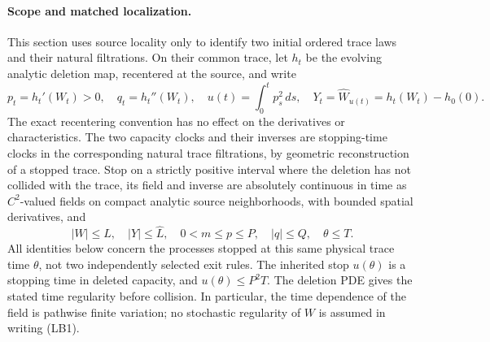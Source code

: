 \documentclass[11pt]{article}
\theoremstyle{definition}\newtheorem{definition}[theorem]{Definition}
\theoremstyle{remark}\newtheorem{remark}[theorem]{Remark}
\begin{document}
\paragraph{Scope and matched localization.}
This section uses source locality only to identify two initial ordered
trace laws and their natural filtrations. On their common trace, let
$h_t$ be the evolving analytic deletion map, recentered at the source,
and write
\[
 p_t=h_t'(W_t)>0,\quad q_t=h_t''(W_t),\quad
 u(t)=\int_0^t p_s^2\,ds,\quad
 Y_t=\widehat W_{u(t)}=h_t(W_t)-h_0(0).
 \tag{LB1}
\]
The exact recentering convention has no effect on the derivatives or
characteristics. The two capacity clocks and their inverses are
stopping-time clocks in the corresponding natural trace filtrations,
by geometric reconstruction of a stopped trace. Stop on a strictly
positive interval where the deletion has not collided with the trace,
its field and inverse are absolutely continuous in time as
$C^2$-valued fields on compact analytic source neighborhoods, with
bounded spatial derivatives, and
\[
 |W|\le L,\quad |Y|\le\widehat L,\quad
 0<m\le p\le P,\quad |q|\le Q,\quad \theta\le T.
 \tag{LB2}
\]
All identities below concern the processes stopped at this same physical
trace time $\theta$, not two independently selected exit rules.
The inherited stop $u(\theta)$ is a stopping time in deleted capacity,
and $u(\theta)\le P^2T$.
The deletion PDE gives the stated time regularity before collision.
In particular, the time dependence of the field is pathwise finite variation;
no stochastic regularity of $W$ is assumed in writing (LB1).
\end{document}
